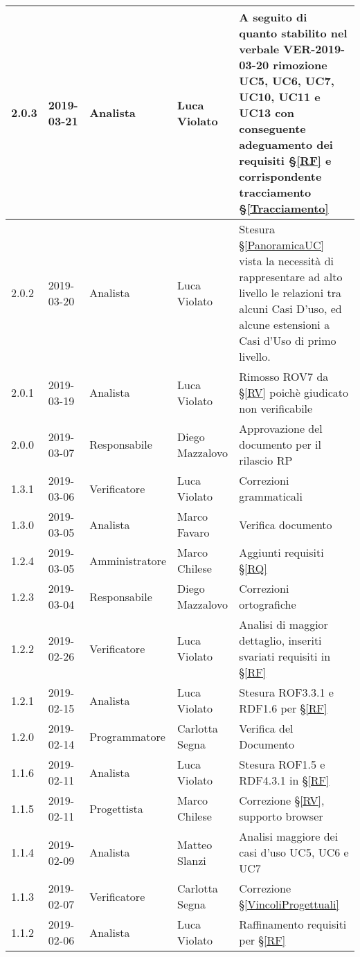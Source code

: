 \begin{center}
\begin{longtable}[C]{|m{}|m{}|m{}|m{}|p{}|}
\hline
\rowcolor{grigio}2.0.3 & 2019-03-21 & Analista & Luca Violato & A seguito di quanto stabilito nel verbale VER-2019-03-20 rimozione UC5, UC6, UC7, UC10, UC11 e UC13 con conseguente adeguamento dei requisiti §\ref{RF} e corrispondente tracciamento §\ref{Tracciamento}\\
\hline
2.0.2 & 2019-03-20 & Analista & Luca Violato & Stesura §\ref{PanoramicaUC} vista la necessità di rappresentare ad alto livello le relazioni tra alcuni Casi D'uso, ed alcune estensioni a Casi d'Uso di primo livello.\\
\hline
\rowcolor{grigio}2.0.1 & 2019-03-19 & Analista & Luca Violato & Rimosso ROV7 da §\ref{RV} poichè giudicato non verificabile\\
\hline
2.0.0 & 2019-03-07 & Responsabile & Diego Mazzalovo & Approvazione del documento per il rilascio RP\\
\hline
\rowcolor{grigio}1.3.1 & 2019-03-06 & Verificatore & Luca Violato & Correzioni grammaticali\\
\hline
1.3.0 & 2019-03-05 & Analista & Marco Favaro & Verifica documento\\
\hline
\rowcolor{grigio}1.2.4 & 2019-03-05 & Amministratore & Marco Chilese & Aggiunti requisiti §\ref{RQ}\\
\hline
1.2.3 & 2019-03-04 & Responsabile & Diego Mazzalovo & Correzioni ortografiche\\
\hline
\rowcolor{grigio}1.2.2 & 2019-02-26 & Verificatore & Luca Violato & Analisi di maggior dettaglio, inseriti svariati requisiti in §\ref{RF}\\
\hline
1.2.1 & 2019-02-15 & Analista & Luca Violato & Stesura ROF3.3.1 e RDF1.6 per §\ref{RF}\\
\hline
\rowcolor{grigio} 1.2.0 & 2019-02-14 & Programmatore & Carlotta Segna & Verifica del Documento\\
\hline
1.1.6 & 2019-02-11 & Analista & Luca Violato & Stesura ROF1.5 e RDF4.3.1 in §\ref{RF}\\
\hline
\rowcolor{grigio}1.1.5 & 2019-02-11 & Progettista & Marco Chilese & Correzione §\ref{RV}, supporto browser\\
\hline
1.1.4 & 2019-02-09 & Analista & Matteo Slanzi & Analisi maggiore dei casi d'uso UC5, UC6 e UC7\\
\hline
\rowcolor{grigio} 1.1.3 & 2019-02-07 & Verificatore & Carlotta Segna & Correzione §\ref{VincoliProgettuali}\\
\hline
1.1.2 & 2019-02-06 & Analista & Luca Violato & Raffinamento requisiti per §\ref{RF}\\

\end{longtable}
\end{center}
